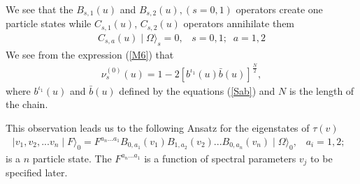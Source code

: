 \documentclass[a4paper,12pt]{article}
\begin{document}
We see that the $B_{s,1}(u)$ and  $B_{s,2}(u), (s=0,1)$ 
operators create
one particle states while $C_{s,1}(u)$, $C_{s,2}(u)$ operators 
annihilate them
\begin{eqnarray}
\label{C1}
C_{s,a}(u)\mid{\Omega}\rangle_{s}=0,\;\;\;s=0,1;\;\;a=1,2
\end{eqnarray}
We see from the expression (\ref{M6}) that 
\begin{eqnarray}
\label{N1}
\nu_{s}^{(0)}(u)=1-2[b^{\iota_1}(u)\bar{b}(u)]^{\frac{N}{2}},
\end{eqnarray}
where $b^{\iota_1}(u)$ and $\bar{b}(u)$ defined by the equations (\ref{Sab})
and $N$ is the length of the chain.

This observation leads us to the following Ansatz for the eigenstates 
of $\tau(v)$ 
\begin{eqnarray}
\label{VF}
\mid{v_{1},v_{2},...v_{n}}\mid{F}\rangle_{0}=F^{{a_n}...{a_1}}
B_{0,a_1}(v_1)B_{1,a_2}(v_2)...
B_{0,a_n}(v_n)\mid{\Omega}\rangle_{0},\;\;\;a_i=1,2;\;\;
\end{eqnarray}
is a $n$ particle state. The $F^{{a_n}...{a_1}}$ is a function of 
spectral parameters $v_j$ to be specified later.
\end{document}
